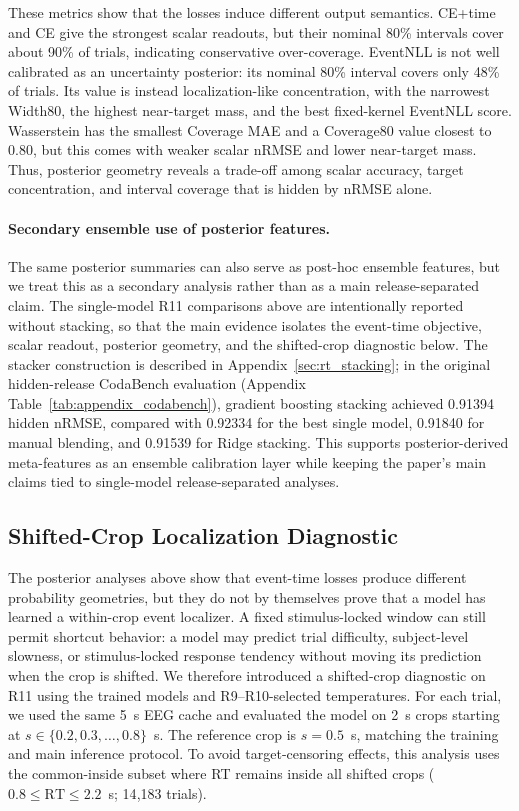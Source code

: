 \documentclass[12pt]{article}
\begin{document}
These metrics show that the losses induce different output semantics. CE+time and CE give the strongest scalar readouts, but their nominal 80\% intervals cover about 90\% of trials, indicating conservative over-coverage. EventNLL is not well calibrated as an uncertainty posterior: its nominal 80\% interval covers only 48\% of trials. Its value is instead localization-like concentration, with the narrowest Width80, the highest near-target mass, and the best fixed-kernel EventNLL score. Wasserstein has the smallest Coverage MAE and a Coverage80 value closest to 0.80, but this comes with weaker scalar nRMSE and lower near-target mass. Thus, posterior geometry reveals a trade-off among scalar accuracy, target concentration, and interval coverage that is hidden by nRMSE alone.

\paragraph{Secondary ensemble use of posterior features.}
The same posterior summaries can also serve as post-hoc ensemble features, but we treat this as a secondary analysis rather than as a main release-separated claim. The single-model R11 comparisons above are intentionally reported without stacking, so that the main evidence isolates the event-time objective, scalar readout, posterior geometry, and the shifted-crop diagnostic below. The stacker construction is described in Appendix~\ref{sec:rt_stacking}; in the original hidden-release CodaBench evaluation (Appendix Table~\ref{tab:appendix_codabench}), gradient boosting stacking achieved 0.91394 hidden nRMSE, compared with 0.92334 for the best single model, 0.91840 for manual blending, and 0.91539 for Ridge stacking. This supports posterior-derived meta-features as an ensemble calibration layer while keeping the paper's main claims tied to single-model release-separated analyses.

\subsection{Shifted-Crop Localization Diagnostic}

The posterior analyses above show that event-time losses produce different probability geometries, but they do not by themselves prove that a model has learned a within-crop event localizer. A fixed stimulus-locked window can still permit shortcut behavior: a model may predict trial difficulty, subject-level slowness, or stimulus-locked response tendency without moving its prediction when the crop is shifted. We therefore introduced a shifted-crop diagnostic on R11 using the trained models and R9--R10-selected temperatures. For each trial, we used the same 5~s EEG cache and evaluated the model on 2~s crops starting at $s\in\{0.2,0.3,\dots,0.8\}$~s. The reference crop is $s=0.5$~s, matching the training and main inference protocol. To avoid target-censoring effects, this analysis uses the common-inside subset where RT remains inside all shifted crops ($0.8\leq \mathrm{RT}\leq 2.2$~s; 14{,}183 trials).
\end{document}
